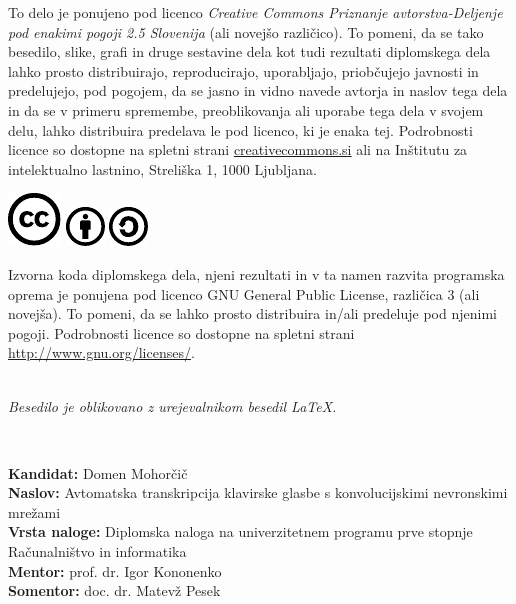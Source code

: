 \documentclass[a4paper, 12pt, openright]{book}
\newcommand{\ttitle}{Avtomatska transkripcija klavirske glasbe s konvolucijskimi nevronskimi mrežami}
\newcommand{\tauthor}{Domen Mohorčič}
\newcommand{\tmentor}{prof. dr. Igor Kononenko}
\newcommand{\tcomentor}{doc. dr. Matevž Pesek}
\newcommand{\clearemptydoublepage}{\newpage{\pagestyle{empty}\cleardoublepage}}
\newcommand{\CcImageCc}[1]{%
	\includegraphics[scale=#1]{cc_cc_30.pdf}%
}
\newcommand{\CcImageBy}[1]{%
	\includegraphics[scale=#1]{cc_by_30.pdf}%
}
\newcommand{\CcImageSa}[1]{%
	\includegraphics[scale=#1]{cc_sa_30.pdf}%
}
\begin{document}
\newpage
\thispagestyle{empty}

\vspace*{5cm}
{\small \noindent
To delo je ponujeno pod licenco \textit{Creative Commons Priznanje avtorstva-Deljenje pod enakimi pogoji 2.5 Slovenija} (ali novej\v so razli\v cico).
To pomeni, da se tako besedilo, slike, grafi in druge sestavine dela kot tudi rezultati diplomskega dela lahko prosto distribuirajo,
reproducirajo, uporabljajo, priobčujejo javnosti in predelujejo, pod pogojem, da se jasno in vidno navede avtorja in naslov tega
dela in da se v primeru spremembe, preoblikovanja ali uporabe tega dela v svojem delu, lahko distribuira predelava le pod
licenco, ki je enaka tej.
Podrobnosti licence so dostopne na spletni strani \href{http://creativecommons.si}{creativecommons.si} ali na Inštitutu za
intelektualno lastnino, Streliška 1, 1000 Ljubljana.

\begin{center}%
\CcImageCc{0.741573033707865}\hspace*{1ex}\CcImageBy{1}\hspace*{1ex}\CcImageSa{1}%
\end{center}
}

\vspace*{1.5cm}
{\small \noindent
Izvorna koda diplomskega dela, njeni rezultati in v ta namen razvita programska oprema je ponujena pod licenco GNU General Public License,
različica 3 (ali novejša). To pomeni, da se lahko prosto distribuira in/ali predeluje pod njenimi pogoji.
Podrobnosti licence so dostopne na spletni strani \url{http://www.gnu.org/licenses/}.
}

\vfill
\begin{center} 
\ \\ \vfill
{\em
Besedilo je oblikovano z urejevalnikom besedil \LaTeX.}
\end{center}

\clearemptydoublepage

\thispagestyle{empty}
\
\vfill

\bigskip
\noindent\textbf{Kandidat:} \tauthor \\
\noindent\textbf{Naslov:} \ttitle \\
\noindent\textbf{Vrsta naloge:} Diplomska naloga na univerzitetnem programu prve stopnje Računalništvo in informatika \\
\noindent\textbf{Mentor:} \tmentor \\
\noindent\textbf{Somentor:} \tcomentor
\end{document}
